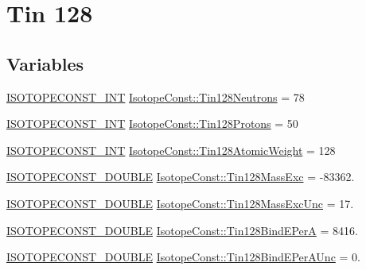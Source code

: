 \hypertarget{group___isotope_const-_tin-_sn128}{}\section{Tin 128}
\label{group___isotope_const-_tin-_sn128}
\subsection*{Variables}
\begin{DoxyCompactItemize}
\item 
\mbox{\hyperlink{group___isotope_const-_macros_ga5f18360b3e99483a35c32d789e62621c}{I\+S\+O\+T\+O\+P\+E\+C\+O\+N\+S\+T\+\_\+\+I\+NT}} \mbox{\hyperlink{group___isotope_const-_tin-_sn128_ga45ab84ba12ddea896569eb0dc6f51d60}{Isotope\+Const\+::\+Tin128\+Neutrons}} = 78
\item 
\mbox{\hyperlink{group___isotope_const-_macros_ga5f18360b3e99483a35c32d789e62621c}{I\+S\+O\+T\+O\+P\+E\+C\+O\+N\+S\+T\+\_\+\+I\+NT}} \mbox{\hyperlink{group___isotope_const-_tin-_sn128_ga9d2354b730fa1f3f5b72179d9d0147a8}{Isotope\+Const\+::\+Tin128\+Protons}} = 50
\item 
\mbox{\hyperlink{group___isotope_const-_macros_ga5f18360b3e99483a35c32d789e62621c}{I\+S\+O\+T\+O\+P\+E\+C\+O\+N\+S\+T\+\_\+\+I\+NT}} \mbox{\hyperlink{group___isotope_const-_tin-_sn128_ga3ff85c248adc854680dd77877308bfc2}{Isotope\+Const\+::\+Tin128\+Atomic\+Weight}} = 128
\item 
\mbox{\hyperlink{group___isotope_const-_macros_ga8f45a7272ce02c0b4c65c44636ed719a}{I\+S\+O\+T\+O\+P\+E\+C\+O\+N\+S\+T\+\_\+\+D\+O\+U\+B\+LE}} \mbox{\hyperlink{group___isotope_const-_tin-_sn128_ga262cd2233a8c60b0c945c89ccef3a00d}{Isotope\+Const\+::\+Tin128\+Mass\+Exc}} = -\/83362.
\item 
\mbox{\hyperlink{group___isotope_const-_macros_ga8f45a7272ce02c0b4c65c44636ed719a}{I\+S\+O\+T\+O\+P\+E\+C\+O\+N\+S\+T\+\_\+\+D\+O\+U\+B\+LE}} \mbox{\hyperlink{group___isotope_const-_tin-_sn128_gaa0fb758383b0a115f6d10980572f7d77}{Isotope\+Const\+::\+Tin128\+Mass\+Exc\+Unc}} = 17.
\item 
\mbox{\hyperlink{group___isotope_const-_macros_ga8f45a7272ce02c0b4c65c44636ed719a}{I\+S\+O\+T\+O\+P\+E\+C\+O\+N\+S\+T\+\_\+\+D\+O\+U\+B\+LE}} \mbox{\hyperlink{group___isotope_const-_tin-_sn128_gacf4b868089c278dd54d6dc0f77c7431c}{Isotope\+Const\+::\+Tin128\+Bind\+E\+PerA}} = 8416.
\item 
\mbox{\hyperlink{group___isotope_const-_macros_ga8f45a7272ce02c0b4c65c44636ed719a}{I\+S\+O\+T\+O\+P\+E\+C\+O\+N\+S\+T\+\_\+\+D\+O\+U\+B\+LE}} \mbox{\hyperlink{group___isotope_const-_tin-_sn128_ga2761fd2d04b9c7c0b2a99269ad68c8cd}{Isotope\+Const\+::\+Tin128\+Bind\+E\+Per\+A\+Unc}} = 0.

\end{DoxyCompactItemize}
